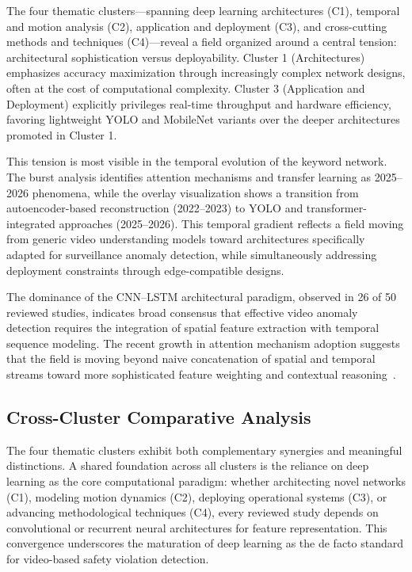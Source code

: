 \documentclass[conference]{IEEEtran}
\begin{document}
The four thematic clusters---spanning deep learning architectures (C1), temporal and motion analysis (C2), application and deployment (C3), and cross-cutting methods and techniques (C4)---reveal a field organized around a central tension: architectural sophistication versus deployability. Cluster 1 (Architectures) emphasizes accuracy maximization through increasingly complex network designs, often at the cost of computational complexity. Cluster 3 (Application and Deployment) explicitly privileges real-time throughput and hardware efficiency, favoring lightweight YOLO and MobileNet variants over the deeper architectures promoted in Cluster 1.

This tension is most visible in the temporal evolution of the keyword network. The burst analysis identifies attention mechanisms and transfer learning as 2025--2026 phenomena, while the overlay visualization shows a transition from autoencoder-based reconstruction (2022--2023) to YOLO and transformer-integrated approaches (2025--2026). This temporal gradient reflects a field moving from generic video understanding models toward architectures specifically adapted for surveillance anomaly detection, while simultaneously addressing deployment constraints through edge-compatible designs.

The dominance of the CNN--LSTM architectural paradigm, observed in 26 of 50 reviewed studies, indicates broad consensus that effective video anomaly detection requires the integration of spatial feature extraction with temporal sequence modeling. The recent growth in attention mechanism adoption suggests that the field is moving beyond naive concatenation of spatial and temporal streams toward more sophisticated feature weighting and contextual reasoning~\cite{b5,b17}.

\subsection{Cross-Cluster Comparative Analysis}

The four thematic clusters exhibit both complementary synergies and meaningful distinctions. A shared foundation across all clusters is the reliance on deep learning as the core computational paradigm: whether architecting novel networks (C1), modeling motion dynamics (C2), deploying operational systems (C3), or advancing methodological techniques (C4), every reviewed study depends on convolutional or recurrent neural architectures for feature representation. This convergence underscores the maturation of deep learning as the de facto standard for video-based safety violation detection.
\end{document}
